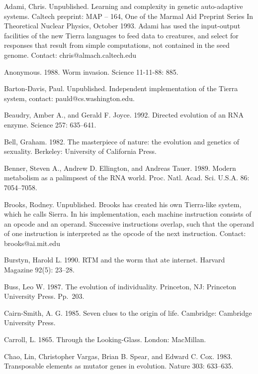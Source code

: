 \begin{thebibliography}{99}

Adami, Chris.  Unpublished.  Learning and complexity in genetic
auto-adaptive systems.  Caltech preprint: MAP -- 164, One of the
Marmal Aid Preprint Series In Theoretical Nuclear Physics,
October 1993.  Adami has used the input-output facilities of the new
Tierra languages to feed data to creatures, and select for responses
that result from simple computations, not contained in the seed genome.
Contact: chris@almach.caltech.edu

Anonymous.  1988.  Worm invasion.  Science 11-11-88: 885.

Barton-Davis, Paul.  Unpublished.  Independent implementation
of the Tierra system, contact: pauld@cs.washington.edu.

Beaudry, Amber A., and Gerald F. Joyce.  1992.  Directed evolution of
an RNA enzyme.  Science 257: 635--641.

Bell, Graham.  1982.  The masterpiece of nature: the evolution and genetics
of sexuality.  Berkeley: University of California Press.

Benner, Steven A., Andrew D. Ellington, and Andreas Tauer.  1989.
Modern metabolism as a palimpsest of the RNA world.  Proc. Natl. Acad. Sci.
U.S.A. 86: 7054--7058.

Brooks, Rodney.  Unpublished.  Brooks has created his own Tierra-like
system, which he calls Sierra.  In his implementation, each machine
instruction consists of an opcode and an operand.  Successive instructions
overlap, such that the operand of one instruction is interpreted as the
opcode of the next instruction.  Contact: brooks@ai.mit.edu

Burstyn, Harold L.  1990.  RTM and the worm that ate internet.  Harvard
Magazine 92(5): 23--28.

Buss, Leo W.  1987.  The evolution of individuality.  Princeton, NJ:
Princeton University Press.  Pp.\ 203.

Cairn-Smith, A. G.  1985.  Seven clues to the origin of life.
Cambridge: Cambridge University Press.

Carroll, L.  1865.  Through the Looking-Glass.  London: MacMillan.

Chao, Lin, Christopher Vargas, Brian B. Spear, and Edward C. Cox.  1983.
Transposable elements as mutator genes in evolution.  Nature 303: 633--635.


\end{thebibliography}
